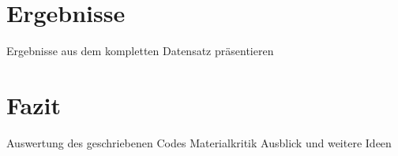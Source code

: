 \section{Ergebnisse}
Ergebnisse aus dem kompletten Datensatz präsentieren

\section{Fazit}
Auswertung des geschriebenen Codes
Materialkritik
Ausblick und weitere Ideen